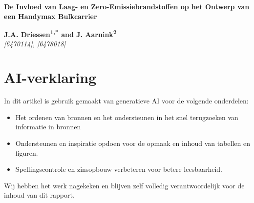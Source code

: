 \documentclass[a4paper]{IMDC2024}
\begin{document}

\vspace*{2pt}

{\fontsize{18}{21}\bfseries De Invloed van Laag- en Zero-Emissiebrandstoffen op het Ontwerp van een Handymax Bulkcarrier}
\vspace{20pt}

\textbf{\fontsize{12}{14}\selectfont J.A. Driessen\textsuperscript{1,*} and J. Aarnink\textsuperscript{2}} \\[4pt]
{\small \textit{[6470114], [6478018]}}

\section{AI-verklaring}
In dit artikel is gebruik gemaakt van generatieve AI voor de volgende onderdelen:\\
\begin{itemize}
    \item Het ordenen van bronnen en het ondersteunen in het snel terugzoeken van informatie in bronnen
    \item Ondersteunen en inspiratie opdoen voor de opmaak en inhoud van tabellen en figuren.
    \item Spellingscontrole en zinsopbouw verbeteren voor betere leesbaarheid.
\end{itemize}
Wij hebben het werk nagekeken en blijven zelf volledig verantwoordelijk voor de inhoud van dit rapport.
\vspace{30pt}
\end{document}
